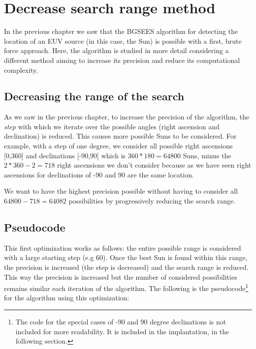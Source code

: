 \chapter{Decrease search range method}

In the previous chapter we saw that the BGSEES algorithm for detecting the location of an EUV source (in this case, the Sun) is possible with a first, brute force approach. Here, the algorithm is studied in more detail considering a different method aiming to increase its precision and reduce its computational complexity.



\section{Decreasing the range of the search}

As we saw in the previous chapter, to increase the precision of the algorithm, the \textit{step} with which we iterate over the possible angles (right ascension and declination) is reduced. This causes more possible Suns to be considered. For example, with a step of one degree, we consider all possible right ascensions [0,360] and declinations [-90,90] which is  $360*180 = 64800$ Suns, minus the $2*360 - 2 = 718$ right ascensions we don't consider because as we have seen right ascensions for declinations of -90 and 90 are the same location.

We want to have the highest precision possible without having to consider all $64800 - 718 = 64082$ possibilities by progressively reducing the search range.

\section{Pseudocode}

This first optimization works as follows: the entire possible range is considered with a large starting step (e.g 60). Once the best Sun is found within this range, the precision is increased (the step is decreased) and the search range is reduced. This way the precision is increased but the number of considered possibilities remains similar each iteration of the algorithm. The following is the pseudocode\footnote{The code for the special cases of -90 and 90 degree declinations is not included for more readability. It is included in the implantation, in the following section.} for the algorithm using this optimization:

